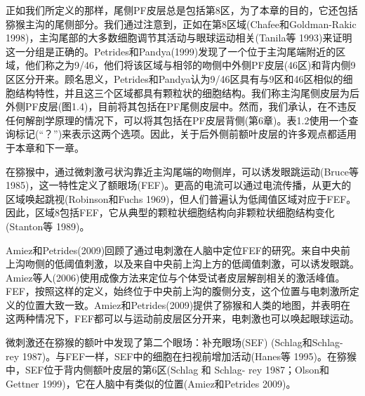 正如我们所定义的那样，尾侧PF皮层总是包括第8区，为了本章的目的，它还包括猕猴主沟的尾侧部分。我们通过注意到，正如在第8区域(Chafee和Goldman-Rakic 1998)，主沟尾部的大多数细胞调节其活动与眼球运动相关(Tanila等 1993)来证明这一分组是正确的。Petrides和Pandya(1999)发现了一个位于主沟尾端附近的区域，他们称之为9/46，他们将该区域与相邻的吻侧中外侧PF皮层(46区)和背内侧9区区分开来。顾名思义，Petrides和Pandya认为9/46区具有与9区和46区相似的细胞结构特性，并且这三个区域都具有颗粒状的细胞结构。我们称主沟尾侧皮层为后外侧PF皮层(图1.4)，目前将其包括在PF尾侧皮层中。然而，我们承认，在不违反任何解剖学原理的情况下，可以将其包括在PF皮层背侧(第6章)。表1.2使用一个查询标记(“？”)来表示这两个选项。因此，关于后外侧前额叶皮层的许多观点都适用于本章和下一章。

在猕猴中，通过微刺激弓状沟靠近主沟尾端的吻侧岸，可以诱发眼跳运动(Bruce等 1985)，这一特性定义了额眼场(FEF)。更高的电流可以通过电流传播，从更大的区域唤起跳视(Robinson和Fuchs 1969)，但人们普遍认为低阈值区域对应于FEF。因此，区域8包括FEF，它从典型的颗粒状细胞结构向非颗粒状细胞结构变化(Stanton等 1989)。

Amiez和Petrides(2009)回顾了通过电刺激在人脑中定位FEF的研究。来自中央前上沟吻侧的低阈值刺激，以及来自中央前上沟上方的低阈值刺激，可以诱发眼跳。Amiez等人(2006)使用成像方法来定位与个体受试者皮层解剖相关的激活峰值。FEF，按照这样的定义，始终位于中央前上沟的腹侧分支，这个位置与电刺激所定义的位置大致一致。Amiez和Petrides(2009)提供了猕猴和人类的地图，并表明在这两种情况下，FEF都可以与运动前皮层区分开来，电刺激也可以唤起眼球运动。

微刺激还在猕猴的额叶中发现了第二个眼场：补充眼场(SEF) (Schlag和Schlag- rey 1987)。与FEF一样，SEF中的细胞在扫视前增加活动(Hanes等 1995)。在猕猴中，SEF位于背内侧额叶皮层的第6区(Schlag 和 Schlag- rey 1987；Olson和Gettner 1999)，它在人脑中有类似的位置(Amiez和Petrides 2009)。
